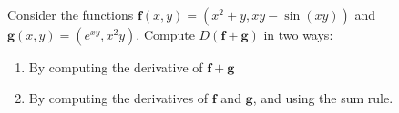 \begin{problem}
Consider the functions $\mathbf{f}(x,y) = (x^2+y, xy-\sin(xy))$ and $\mathbf{g}(x,y) = (e^{xy}, x^2y)$. Compute $D(\mathbf{f} + \mathbf{g})$ in two ways:
\begin{enumerate}
\item By computing the derivative of $\mathbf{f} + \mathbf{g}$
\item By computing the derivatives of $\mathbf{f}$ and $\mathbf{g}$, and using the sum rule.
\end{enumerate}
\end{problem}